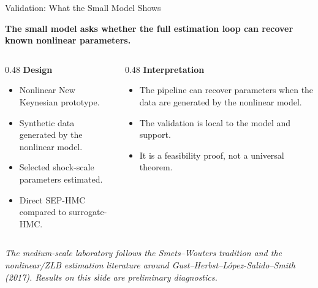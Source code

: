 \documentclass[aspectratio=169,10pt]{beamer}
\newcommand{\sourcefoot}[1]{%
  \vspace{-0.55em}
  \begin{flushleft}
  \parbox{0.96\linewidth}{\raggedright\tiny\textit{#1}}
  \end{flushleft}
}
\newcommand{\claim}[1]{%
  \begin{center}
  \parbox{0.94\linewidth}{\centering\large\bfseries #1}
  \end{center}
}
\begin{document}
\begin{frame}{Validation: What the Small Model Shows}
\claim{The small model asks whether the full estimation loop can recover known nonlinear parameters.}

\vspace{0.4em}
\begin{columns}[T,onlytextwidth]
\begin{column}{0.48\textwidth}
\textbf{Design}
\begin{itemize}
  \item Nonlinear New Keynesian prototype.
  \item Synthetic data generated by the nonlinear model.
  \item Selected shock-scale parameters estimated.
  \item Direct SEP-HMC compared to surrogate-HMC.
\end{itemize}
\end{column}
\begin{column}{0.48\textwidth}
\textbf{Interpretation}
\begin{itemize}
  \item The pipeline can recover parameters when the data are generated by the nonlinear model.
  \item The validation is local to the model and support.
  \item It is a feasibility proof, not a universal theorem.
\end{itemize}
\end{column}
\end{columns}
\sourcefoot{The medium-scale laboratory follows the Smets--Wouters tradition and the nonlinear/ZLB estimation literature around Gust--Herbst--L\'opez-Salido--Smith (2017). Results on this slide are preliminary diagnostics.}
\end{frame}
\end{document}
